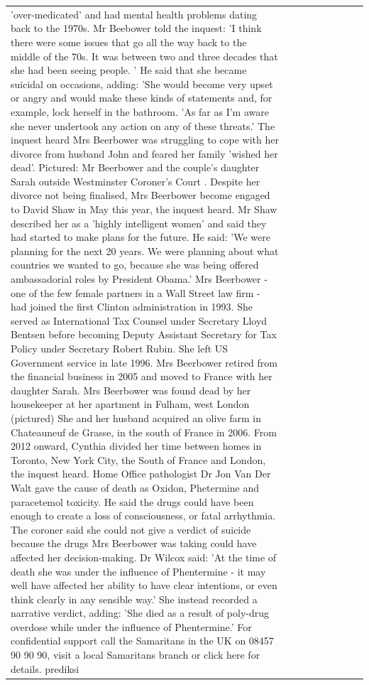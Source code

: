 \begin{table}[H]
\begin{tabular}{lllrlllll}
'over-medicated' and had mental health problems dating back to the 1970s. Mr Beebower told the inquest: 'I think there were some issues that go all the way back to the middle of the 70s. It was between two and three decades that she had been seeing people. ' He said that she became suicidal on occasions, adding: 'She would become very upset or angry and would make these kinds of statements and, for example, lock herself in the bathroom. 'As far as I'm aware she never undertook any action on any of these threats.' The inquest heard Mrs Beerbower was struggling to cope with her divorce from husband John and feared her family 'wished her dead'. Pictured: Mr Beerbower and the couple's daughter Sarah outside Westminster Coroner's Court . Despite her divorce not being finalised, Mrs Beerbower become engaged to David Shaw in May this year, the inquest heard. Mr Shaw described her as a 'highly intelligent women' and said they had started to make plans for the future. He said: 'We were planning for the next 20 years. We were planning about what countries we wanted to go, because she was being offered ambassadorial roles by President Obama.' Mrs Beerbower - one of the few female partners in a Wall Street law firm - had joined the first Clinton administration in 1993. She served as International Tax Counsel under Secretary Lloyd Bentsen before becoming Deputy Assistant Secretary for Tax Policy under Secretary Robert Rubin. She left US Government service in late 1996. Mrs Beerbower retired from the financial business in 2005 and moved to France with her daughter Sarah. Mrs Beerbower was found dead by her housekeeper at her apartment in Fulham, west London (pictured) She and her husband acquired an olive farm in Chateauneuf de Grasse, in the south of France in 2006. From 2012 onward, Cynthia divided her time between homes in Toronto, New York City, the South of France and London, the inquest heard. Home Office pathologist Dr Jon Van Der Walt gave the cause of death as Oxidon, Phetermine and paracetemol toxicity. He said the drugs could have been enough to create a loss of consciousness, or fatal arrhythmia. The coroner said she could not give a verdict of suicide because the drugs Mrs Beerbower was taking could have affected her decision-making. Dr Wilcox said: 'At the time of death she was under the influence of Phentermine - it may well have affected her ability to have clear intentions, or even think clearly in any sensible way.' She instead recorded a narrative verdict, adding: 'She died as a result of poly-drug overdose while under the influence of Phentermine.' For confidential support call the Samaritans in the UK on 08457 90 90 90, visit a local Samaritans branch or click here for details. prediksi \\

\end{tabular}
\end{table}
